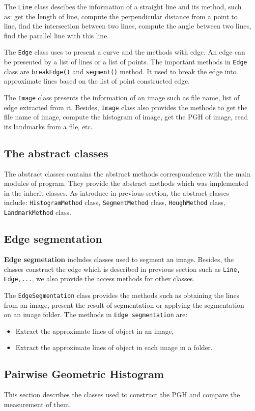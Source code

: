 The \texttt{Line} class descibes the information of a straight line and its method, such as: get the length of line, compute the perpendicular distance from a point to line, find the intersection between two lines, compute the angle between two lines, find the parallel line with this line.

The \texttt{Edge} class uses to present a curve and the methods with edge. An edge can be presented by a list of lines or a list of points. The important methods in \texttt{Edge} class are \texttt{breakEdge()} and \texttt{segment()} method. It used to break the edge into approximate lines based on the list of point constructed edge.

The \texttt{Image} class presents the information of an image such as file name, list of edge extracted from it. Besides, \texttt{Image} class also provides the methods to get the file name of image, compute the histogram of image, get the PGH of image, read its landmarks from a file, etc.
\subsection*{The abstract classes}
The abstract classes contains the abstract methods correspondence with the main modules of program. They provide the abstract methods which was implemented in the inherit classes. As introduce in previous section, the abstract classes include: \texttt{HistogramMethod} class, \texttt{SegmentMethod} class, \texttt{HoughMethod} class, \texttt{LandmarkMethod} class.
\subsection{Edge segmentation }
\textbf{Edge segmetation} includes classes used to segment an image. Besides, the classes construct the edge which is described in previous section such as \texttt{Line, Edge,...}, we also provide the access methods for other classes.

The \texttt{EdgeSegmentation} class provides the methods such as obtaining the lines from an image, present the result of segmentation or applying the segmentation on an image folder. The methods in \texttt{Edge segmentation} are:
\begin{itemize}
\item Extract the approximate lines of object in an image,
\item Extract the approximate lines of object in each image in a folder.
\end{itemize}
\subsection{Pairwise Geometric Histogram}
This section describes the classes used to construct the PGH and compare the measurement of them.

